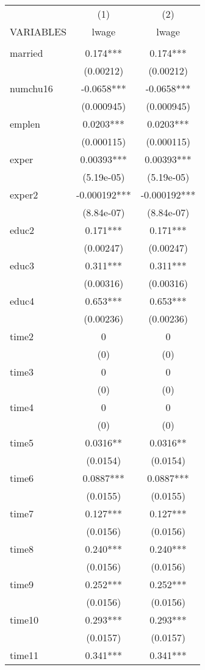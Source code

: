 \documentclass[]{article}
\begin{document}
\begin{tabular}{lcc} \hline
 & (1) & (2) \\
VARIABLES & lwage & lwage \\ \hline
 &  &  \\
married & 0.174*** & 0.174*** \\
 & (0.00212) & (0.00212) \\
numchu16 & -0.0658*** & -0.0658*** \\
 & (0.000945) & (0.000945) \\
emplen & 0.0203*** & 0.0203*** \\
 & (0.000115) & (0.000115) \\
exper & 0.00393*** & 0.00393*** \\
 & (5.19e-05) & (5.19e-05) \\
exper2 & -0.000192*** & -0.000192*** \\
 & (8.84e-07) & (8.84e-07) \\
educ2 & 0.171*** & 0.171*** \\
 & (0.00247) & (0.00247) \\
educ3 & 0.311*** & 0.311*** \\
 & (0.00316) & (0.00316) \\
educ4 & 0.653*** & 0.653*** \\
 & (0.00236) & (0.00236) \\
time2 & 0 & 0 \\
 & (0) & (0) \\
time3 & 0 & 0 \\
 & (0) & (0) \\
time4 & 0 & 0 \\
 & (0) & (0) \\
time5 & 0.0316** & 0.0316** \\
 & (0.0154) & (0.0154) \\
time6 & 0.0887*** & 0.0887*** \\
 & (0.0155) & (0.0155) \\
time7 & 0.127*** & 0.127*** \\
 & (0.0156) & (0.0156) \\
time8 & 0.240*** & 0.240*** \\
 & (0.0156) & (0.0156) \\
time9 & 0.252*** & 0.252*** \\
 & (0.0156) & (0.0156) \\
time10 & 0.293*** & 0.293*** \\
 & (0.0157) & (0.0157) \\
time11 & 0.341*** & 0.341*** \\

\end{tabular}
\end{document}
